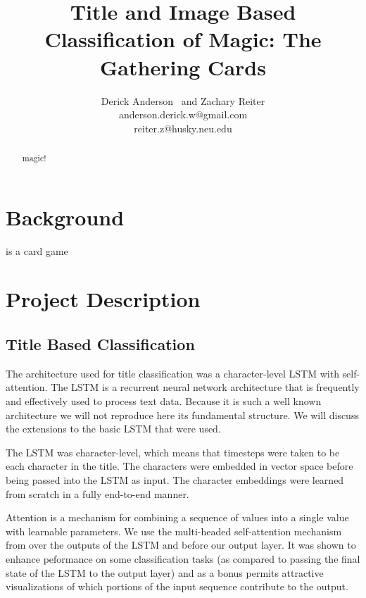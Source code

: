 \documentclass[letterpaper]{article} %
\begin{document}
%
\title{Title and Image Based Classification of Magic: The Gathering Cards}
\author{Derick Anderson \ and Zachary Reiter\\
  anderson.derick.w@gmail.com\\
  reiter.z@husky.neu.edu
}
\maketitle
\begin{abstract}
magic!
\end{abstract}



\section{Background}

is a card game

\section{Project Description}



\subsection{Title Based Classification}

The architecture used for title classification
was a character-level LSTM with self-attention.
The LSTM \cite{Hochreiter1997LongSM} is a recurrent neural network architecture
that is frequently and effectively \cite{Schmidhuber2015DeepLI}
used to process text data.
Because it is such a well known architecture
we will not reproduce here its fundamental structure.
We will discuss the extensions to the basic LSTM that were used.

The LSTM was character-level,
which means that timesteps were taken to be each character in the title.
The characters were embedded in vector space
before being passed into the LSTM as input.
The character embeddings were learned from scratch
in a fully end-to-end manner.

Attention is a mechanism for combining a sequence of values into a single value
with learnable parameters.
We use the multi-headed self-attention mechanism from \cite{Lin2017ASS}
over the outputs of the LSTM and before our output layer.
It was shown to enhance peformance on some classification tasks
(as compared to passing the final state of the LSTM to the output layer)
and as a bonus permits attractive visualizations
of which portions of the input sequence contribute to the output.
\end{document}
